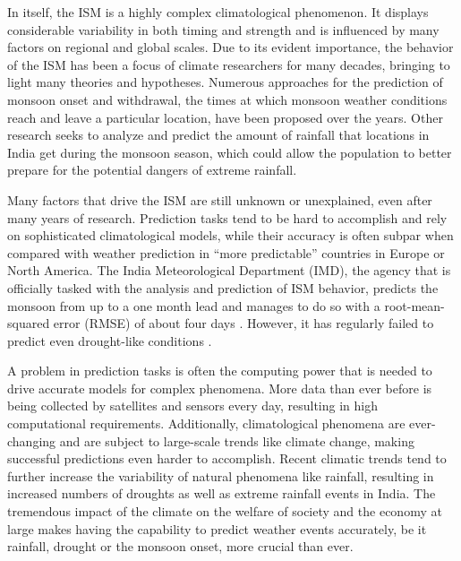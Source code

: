In itself, the ISM is a highly complex climatological phenomenon. It displays considerable variability in both timing and strength and is influenced by many factors on regional and global scales. Due to its evident importance, the behavior of the ISM has been a focus of climate researchers for many decades, bringing to light many theories and hypotheses. Numerous approaches for the prediction of monsoon onset and withdrawal, the times at which monsoon weather conditions reach and leave a particular location, have been proposed over the years. Other research seeks to analyze and predict the amount of rainfall that locations in India get during the monsoon season, which could allow the population to better prepare for the potential dangers of extreme rainfall.

Many factors that drive the ISM are still unknown or unexplained, even after many years of research. Prediction tasks tend to be hard to accomplish and rely on sophisticated climatological models, while their accuracy is often subpar when compared with weather prediction in ``more predictable'' countries in Europe or North America. The India Meteorological Department (IMD), the agency that is officially tasked with the analysis and prediction of ISM behavior, predicts the monsoon from up to a one month lead and manages to do so with a root-mean-squared error (RMSE) of about four days \citep{Pradhan.2017}. However, it has regularly failed to predict even drought-like conditions \citep{Paliwal.24.09.2017}.

A problem in prediction tasks is often the computing power that is needed to drive accurate models for complex phenomena. More data than ever before is being collected by satellites and sensors every day, resulting in high computational requirements. Additionally, climatological phenomena are ever-changing and are subject to large-scale trends like climate change, making successful predictions even harder to accomplish. Recent climatic trends tend to further increase the variability of natural phenomena like rainfall, resulting in increased numbers of droughts as well as extreme rainfall events in India. The tremendous impact of the climate on the welfare of society and the economy at large makes having the capability to predict weather events accurately, be it rainfall, drought or the monsoon onset, more crucial than ever.

